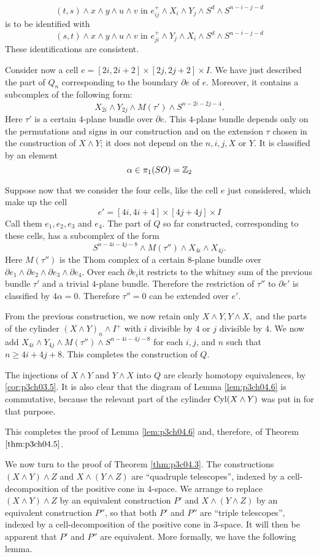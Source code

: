 \documentclass[../main]{subfiles}
\begin{document}
$$(t,s)\wedge x\wedge y\wedge u\wedge v\text{  in  }e_{ij}^+ \wedge X_i\wedge Y_j \wedge S^d \wedge S^{n-i-j-d}$$
is to be identified with 
$$(s,t)\wedge x\wedge y\wedge u\wedge v\text{  in  }e_{ji}^+ \wedge Y_j\wedge X_i \wedge S^d \wedge S^{n-i-j-d}$$
These identifications are consistent.

Consider now a cell $e=[2i,2i+2]\times [2j,2j+2]\times I$. We have just described the part of $Q_n$ corresponding to the boundary $\partial e$ of $e$. Moreover, it contains a subcomplex of the following form:
$$X_{2i}\wedge Y_{2j}\wedge M(\tau') \wedge S^{n-2i-2j-4}.$$
Here $\tau'$ is a certain $4$-plane bundle over $\partial e$. This $4$-plane bundle depends only on the permutations and signs in our construction and on the extension $\tau$ chosen in the construction of $X\wedge Y$; it does not depend on the $n,i,j,X$ or $Y$. It is classified by an element $$\alpha\in \pi_1(SO) = \mathbb{Z}_2$$

Suppose now that we consider the four cells, like the cell $e$ just considered, which make up the cell $$e'=[4i,4i+4]\times [4j+4j]\times I $$
Call them $e_1,e_2,e_3$ and $e_4$. The part of $Q$ so far constructed, corresponding to these cells, has a subcomplex of the form $$S^{n-4i-4j-8}\wedge M(\tau'')\wedge X_{4i}\wedge X_{4j} .$$
Here $M(\tau'')$ is the Thom complex of a certain $8$-plane bundle over $\partial e_1\wedge\partial e_2\wedge\partial e_3\wedge\partial e_4$. Over each $\partial e_i$it restricts to the whitney sum of the previous bundle $\tau'$ and a trivial $4$-plane bundle. Therefore the restriction of $\tau''$ to $\partial e'$ is classified by $4\alpha=0$. Therefore $\tau''=0$ can be extended over $e'$.

From the previous construction, we now retain only $X\wedge Y, Y\wedge X,$ and the parts of the cylinder $(X\wedge Y)_n \wedge I^+$ with $i$ divisible by $4$ or $j$ divisible by $4$. We now add $X_{4i}\wedge Y_{4j} \wedge M(\tau'') \wedge S^{n-4i-4j-8}$ for each $i,j$, and $n$ such that $n\geq 4i+4j+8$. This completes the construction of $Q$.

The injections of $X\wedge Y$ and $Y\wedge X$ into $Q$ are clearly homotopy equivalences, by \ref{cor:p3ch03.5}. It is also clear that the diagram of Lemma \ref{lem:p3ch04.6} is commutative, because the relevant part of the cylinder $\mathop{\mathrm{Cyl}}(X\wedge Y)$ was put in for that purpose.

This completes the proof of Lemma \ref{lem:p3ch04.6} and, therefore, of Theorem $\ref{thm:p3ch04.5}$.


We now turn to the proof of Theorem \ref{thm:p3c04.3}. The constructions $(X \wedge Y) \wedge Z$ and $X \wedge (Y \wedge Z)$ are ``quadruple telescopes'', indexed by a cell-decomposition of the positive cone in 4-space. We arrange to replace $(X \wedge Y) \wedge Z$ by an equivalent construction $P'$ and $X \wedge (Y \wedge Z)$ by an equivalent construction $P''$, so that both $P'$ and $P''$ are ``triple telescopes'', indexed by a cell-decomposition of the positive cone in 3-space. It will then be apparent that $P'$ and $P''$ are equivalent. More formally, we have the following lemma.
\end{document}
